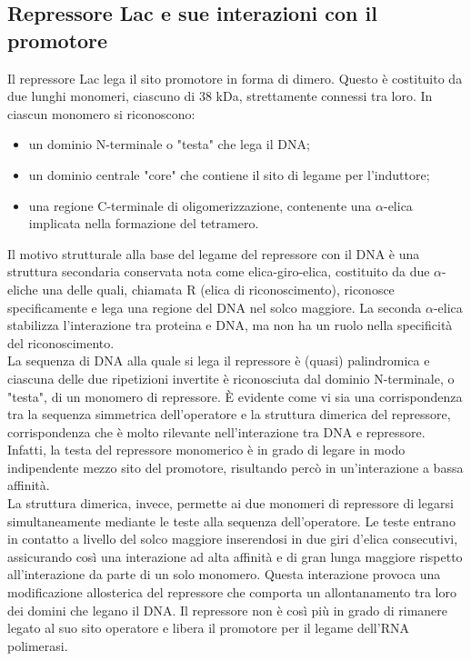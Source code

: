\documentclass{article}
\begin{document}
\subsection{Repressore Lac e sue interazioni con il promotore}
Il repressore Lac lega il sito promotore in forma
di dimero. Questo è costituito da due lunghi monomeri, ciascuno di 38 kDa,
strettamente connessi tra loro. In ciascun monomero si riconoscono:
\begin{itemize}
    \item un dominio N-terminale o "testa" che lega il DNA;
    \item un dominio centrale "core" che contiene il sito di legame per l'induttore;
    \item una regione C-terminale di oligomerizzazione, contenente una $\alpha$-elica implicata nella formazione del tetramero.
\end{itemize}
Il motivo strutturale alla base del legame del repressore con il DNA è una
struttura secondaria conservata nota come elica-giro-elica, costituito da due $\alpha$-eliche una delle quali, 
chiamata R (elica di riconoscimento), riconosce specificamente e lega una regione del
DNA nel solco maggiore. La seconda $\alpha$-elica stabilizza l'interazione tra proteina
e DNA, ma non ha un ruolo nella specificità del riconoscimento.\\
La sequenza di DNA alla quale si lega il repressore è (quasi)
palindromica e ciascuna delle due ripetizioni invertite è riconosciuta dal dominio N-terminale, o "testa", di un monomero di repressore. È evidente come vi
sia una corrispondenza tra la sequenza simmetrica dell'operatore e la struttura
dimerica del repressore, corrispondenza che è molto rilevante nell'interazione tra DNA e repressore.\\
Infatti, la testa del repressore monomerico è
in grado di legare in modo indipendente mezzo sito del promotore, risultando percò in un'interazione a bassa affinità.\\
La struttura dimerica, invece, permette ai due monomeri di repressore di legarsi simultaneamente mediante le teste alla
sequenza dell'operatore.
Le teste entrano in contatto a livello del solco maggiore inserendosi in due giri d'elica consecutivi, 
assicurando così una interazione ad alta affinità e di gran lunga maggiore rispetto all'interazione da parte di un solo monomero.
Questa interazione provoca una modificazione
allosterica del repressore che comporta un allontanamento tra loro dei domini
che legano il DNA. Il repressore non è così più in grado di rimanere legato al suo
sito operatore e libera il promotore per il legame dell'RNA polimerasi.
\end{document}
